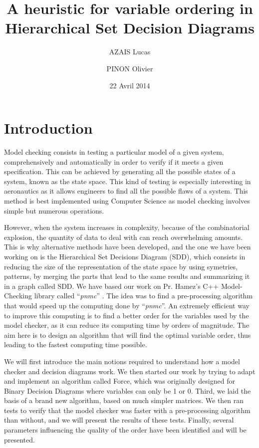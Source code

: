\documentclass[12pt]{report}
\title{A heuristic for variable ordering in Hierarchical Set Decision Diagrams}
\author{ AZAIS Lucas \and PINON Olivier}
\date{22 Avril 2014}
\begin{document}
\maketitle

\tableofcontents
\newpage

\section*{Introduction}

Model checking consists in testing a particular model of a given system, comprehensively and automatically in order to verify if it meets a given specification. This can be achieved by generating all the possible states of a system, known as the state space. This kind of testing is especially interesting in aeronautics as it allows engineers to find all the possible flaws of a system. This method is best implemented using Computer Science as model checking involves simple but numerous operations.

However, when the system increases in complexity, because of the combinatorial explosion, the quantity of data to deal with can reach overwhelming amounts. This is why alternative methods have been developed, and the one we have been working on is the Hierarchical Set Decisions Diagram (SDD), which consists in reducing the size of the representation of the state space by using symetries, patterns, by merging the parts that lead to the same results and summarizing it in a graph called SDD. We have based our work on Pr. Hamez’s C++ Model-Checking library called \enquote{\textit{pnmc}} \cite{pnmc}. The idea was to find a pre-processing algorithm that would speed up the computing done by \enquote{\textit{pnmc}}. An extremely efficient way to improve this computing is to find a better order for the variables used by the model checker, as it can reduce its computing time by orders of magnitude. The aim here is to design an algorithm that will find the optimal variable order, thus leading to the fastest computing time possible.

We will first introduce the main notions required to understand how a model checker and decision diagrams work. We then started our work by trying to adapt and implement an algorithm called Force, which was originally designed for Binary Decision Diagrams where variables can only be 1 or 0. Third, we laid the basis of a brand new algorithm, based on much simpler matrices. We then ran tests to verify that the model checker was faster with a pre-processing algorithm than without, and we will present the results of these tests. Finally, several parameters influencing the quality of the order have been identified and will be presented.
\end{document}
